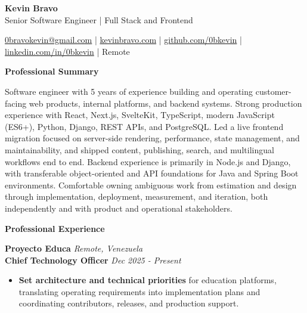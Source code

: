 \documentclass[10pt]{article}
\newcommand{\sectiontitle}[1]{%
    \vspace{4pt}
    \begin{center}
        \textbf{#1}
    \end{center}
    \vspace{-5pt}
}
\begin{document}
\raggedright

\begin{center}
    {\LARGE \textbf{Kevin Bravo}}\\
    Senior Software Engineer | Full Stack and Frontend \\
    \hrulefill
\end{center}

\begin{center}
    \href{mailto:0bravokevin@gmail.com}{0bravokevin@gmail.com}
    | \href{https://kevinbravo.com}{kevinbravo.com}
    | \href{https://github.com/0bkevin}{github.com/0bkevin}
    | \href{https://www.linkedin.com/in/0bkevin/}{linkedin.com/in/0bkevin}
    | Remote
\end{center}

\fontsize{10}{11.3}\selectfont

\sectiontitle{Professional Summary}
Software engineer with 5 years of experience building and operating customer-facing web products, internal platforms, and backend systems. Strong production experience with React, Next.js, SvelteKit, TypeScript, modern JavaScript (ES6+), Python, Django, REST APIs, and PostgreSQL. Led a live frontend migration focused on server-side rendering, performance, state management, and maintainability, and shipped content, publishing, search, and multilingual workflows end to end. Backend experience is primarily in Node.js and Django, with transferable object-oriented and API foundations for Java and Spring Boot environments. Comfortable owning ambiguous work from estimation and design through implementation, deployment, measurement, and iteration, both independently and with product and operational stakeholders.

\sectiontitle{Professional Experience}

\textbf{Proyecto Educa} \hfill \textit{Remote, Venezuela} \\
\textbf{Chief Technology Officer} \hfill \textit{Dec 2025 - Present}
\begin{itemize}
    \item \textbf{Set architecture and technical priorities} for education platforms, translating operating requirements into implementation plans and coordinating contributors, releases, and production support.
\end{itemize}
\end{document}
